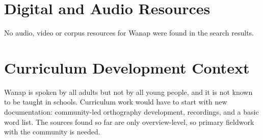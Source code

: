 \documentclass[12pt]{article}
\begin{document}
\section{Digital and Audio Resources}
No audio, video or corpus resources for Wanap were found in the search results.

\section{Curriculum Development Context}
Wanap is spoken by all adults but not by all young people, and it is not known to be taught in schools. Curriculum work would have to start with new documentation: community-led orthography development, recordings, and a basic word list. The sources found so far are only overview-level, so primary fieldwork with the community is needed.
\end{document}
